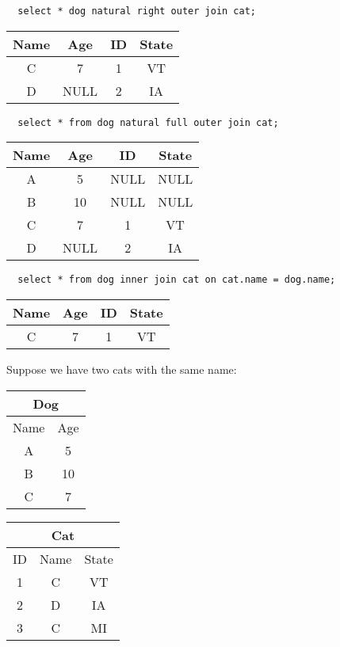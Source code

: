 \documentclass{math}
\begin{document}
\begin{lstlisting}
  select * dog natural right outer join cat;
\end{lstlisting}
\begin{center}
  \begin{tabular}{|c|c|c|c|}
    \hline
    Name & Age & ID & State \\
    \hline
    C & 7 & 1 & VT \\
    D & NULL & 2 & IA \\
    \hline
  \end{tabular}
\end{center}
\begin{lstlisting}
  select * from dog natural full outer join cat;
\end{lstlisting}
\begin{center}
  \begin{tabular}{|c|c|c|c|}
    \hline
    Name & Age & ID & State \\
    \hline
    A & 5 & NULL & NULL \\
    B & 10 & NULL & NULL \\
    C & 7 & 1 & VT \\
    D & NULL & 2 & IA \\
    \hline
  \end{tabular}
\end{center}
\begin{lstlisting}
  select * from dog inner join cat on cat.name = dog.name;
\end{lstlisting}
\begin{center}
  \begin{tabular}{|c|c|c|c|}
    \hline
    Name & Age & ID & State \\
    \hline
    C & 7 & 1 & VT \\
    \hline
  \end{tabular}
\end{center}
Suppose we have two cats with the same name:
\begin{center}
  \begin{tabular}{|c|c|}
    \hline
    \multicolumn{2}{|c|}{Dog} \\
    \hline
    Name & Age \\
    \hline
    A & 5 \\
    B & 10 \\
    C & 7 \\
    \hline
  \end{tabular}
  \begin{tabular}{|c|c|c|}
    \hline
    \multicolumn{3}{|c|}{Cat} \\
    \hline
    ID & Name & State \\
    \hline
    1 & C & VT \\
    2 & D & IA \\
    3 & C & MI \\
    \hline
  \end{tabular}
\end{center}
\end{document}
